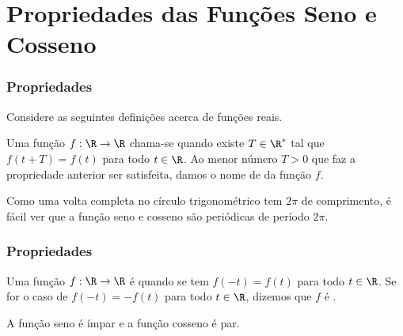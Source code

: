 \documentclass[10pt]{beamer}
\begin{document}
\section{Propriedades das Funções Seno e Cosseno}
\begin{frame}
\frametitle{Propriedades} %


Considere as seguintes definições acerca de funções reais.

\begin{definicao}
Uma função $f: \R \to \R$ chama-se  quando existe $T
\in \R^\ast$ tal que $f(t + T) = f(t)$ para todo $t \in \R$. Ao
menor número $T>0$ que faz a propriedade anterior ser satisfeita,
damos o nome de  da função $f$.
\end{definicao}\pause
Como uma volta completa no círculo trigonométrico tem $2 \pi$ de
comprimento, é fácil ver que a função seno e cosseno são periódicas
de período $2\pi$.
\end{frame}

\begin{frame}
\frametitle{Propriedades} %

\begin{definicao}
Uma função $f: \R \to \R$ é  quando se tem $f(-t) = f(t)$
para todo $t\in \R$. Se for o caso de $f(-t) = - f(t)$ para todo $t
\in \R$, dizemos que $f$ é .
\end{definicao}\pause

\begin{proposicao}
A função seno é ímpar e a função cosseno é par.
\end{proposicao}


\end{frame}
\end{document}
